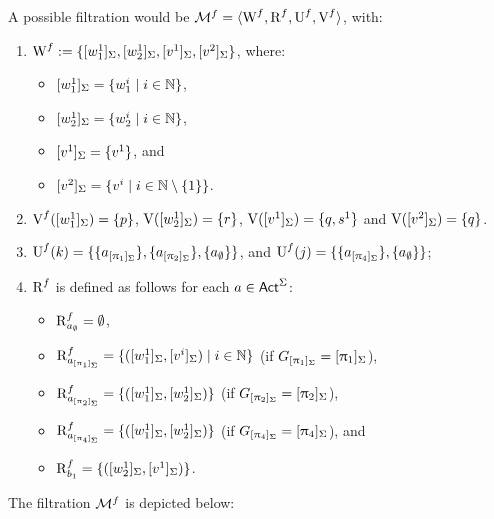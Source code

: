 \begin{example}
A possible filtration would be $\mathcal{M}^f = \langle \operatorname{W}^f,\operatorname{R}^f,\operatorname{U}^f,\operatorname{V}^f \rangle$, with: 
\begin{enumerate}
\item $\operatorname{W}^f := \{ [w^1_1]_\Sigma,[w^1_2]_\Sigma,[v^1]_\Sigma,[v^2]_\Sigma \}$, where:
    \begin{itemize}
        \item $[w^1_1]_\Sigma=\{ w^i_1 \mid i \in \mathbb{N} \}$,
        \item $[w^1_2]_\Sigma=\{ w^i_2 \mid i \in \mathbb{N} \}$, 
        \item $[v^1]_\Sigma=\{ v^1 \}$, 
        and 
        \item $[v^2]_\Sigma=\{ v^i \mid i \in \mathbb{N} \setminus \{ 1 \} \}$.
    \end{itemize}
\item $\operatorname{V}^f([w^1_1]_\Sigma) = \{ p \}$, $\operatorname{V}([w^1_2]_\Sigma) = \{ r \}$, $\operatorname{V}([v^1]_\Sigma) = \{ q,s^1 \}$ and $\operatorname{V}([v^2]_\Sigma) = \{ q \}$.
\item
$\operatorname{U}^f(k) = \{ \{ a_{[\uppi_1]_\Sigma} \}, \{ a_{[\uppi_2]_\Sigma} \}, \{ a_\emptyset \} \}$, and 
$\operatorname{U}^f(j) = \{ \{ a_{[\uppi_4]_\Sigma} \}, \{ a_\emptyset \} \}$;
\item $\operatorname{R}^f$ is defined as follows for each $a \in {\rm \sf Act}^\Sigma$:
\begin{itemize}
\item $\operatorname{R}^f_{a_\emptyset} = \emptyset$,
\item $\operatorname{R}^f_{a_{[\uppi_1]_\Sigma}} = \{ ([w^1_1]_\Sigma,[v^i]_\Sigma) \mid i \in \mathbb{N} \}$ (if $G_{[\uppi_1]_\Sigma} = [\uppi_1]_\Sigma$),
\item $\operatorname{R}^f_{a_{[\uppi_2]_\Sigma}} = \{ ([w^1_1]_\Sigma,[w^1_2]_\Sigma) \}$ (if $G_{[\uppi_2]_\Sigma} = [\uppi_2]_\Sigma$),
\item $\operatorname{R}^f_{a_{[\uppi_4]_\Sigma}} = \{ ([w^1_1]_\Sigma,[w^1_2]_\Sigma) \}$ (if $G_{[\uppi_4]_\Sigma} = [\uppi_4]_\Sigma$), and 
\item $\operatorname{R}^f_{b_1} = \{ ([w^1_2]_\Sigma,[v^1]_\Sigma) \}$. %
\end{itemize}
\end{enumerate}


The filtration $\mathcal{M}^f$ is depicted below:

\begin{center}
\end{center}
\end{example}
